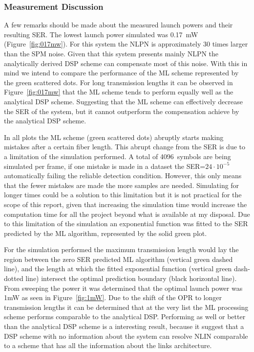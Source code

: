 \subsubsection{Measurement Discussion}

A few remarks should be made about the measured launch powers and their resulting SER. The lowest launch power simulated was 0.17~mW (Figure~\ref{fig:017mw}). For this system the NLPN is approximately 30 times larger than the SPM noise. Given that this system presents mainly NLPN the analytically derived DSP scheme can compensate most of this noise. With this in mind we intend to compare the performance of the ML scheme represented by the green scattered dots. For long transmission lengths it can be observed in Figure~\ref{fig:017mw} that the ML scheme tends to perform equally well as the analytical DSP scheme. Suggesting that the ML scheme can effectively decrease the SER of the system, but it cannot outperform the compensation achieve by the analytical DSP scheme.
 
 In all plots the ML scheme (green scattered dots) abruptly starts making mistakes after a certain fiber length. This abrupt change from the SER is due to a limitation of the simulation performed. A total of 4096~symbols are being simulated per frame, if one mistake is made in a dataset the SER=$24\cdot10^{-5}$ automatically failing the reliable detection condition. However, this only means that the fewer mistakes are made the more samples are needed. Simulating for longer times could be a solution to this limitation but it is not practical for the scope of this report, given that increasing the simulation time would increase the computation time for all the project beyond what is available at my disposal. Due to this limitation of the simulation an exponential function was fitted to the SER predicted by the ML algorithm, represented by the solid green plot. 

For the simulation performed the maximum transmission length would lay the region between the zero SER predicted ML algorithm (vertical green dashed line), and the length at which the fitted exponential function (vertical green dash-dotted line) intersect the optimal prediction boundary (black horizontal line). From sweeping the power it was determined that the optimal launch power was 1mW as seen in Figure~\ref{fig:1mW}. Due to the shift of the OPR to longer transmission lengths it can be determined that at the very list the ML processing scheme performs comparable to the analytical DSP. Performing as well or better than the analytical DSP scheme is a interesting result, because it suggest that a DSP scheme with no information about the system can resolve NLIN comparable to a scheme that has all the information about the links architecture.

